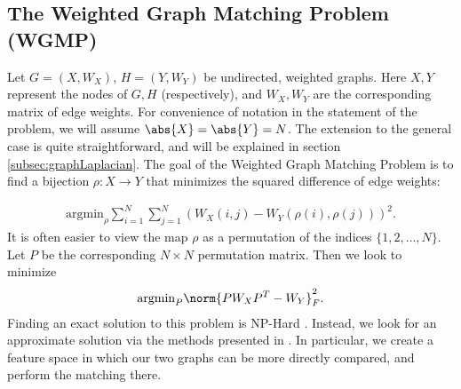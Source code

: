 \documentclass{article}[11pt]
\begin{document}
\subsection{The Weighted Graph Matching Problem (WGMP)}
\label{subsec:WGMP}
Let $G = (X,W_X)$, $H = (Y,W_Y)$ be undirected, weighted graphs. Here $X, Y$
represent the nodes of $G, H$ (respectively), and $W_X,W_Y$ are the corresponding
matrix of edge weights. For convenience of notation in the statement of the
problem, we will assume $\abs{X} = \abs{Y} = N$. The extension to the general
case is quite straightforward, and will be explained in section
\ref{subsec:graphLaplacian}. The goal of the Weighted Graph Matching Problem is
to find a bijection $\rho:X \to Y$ that minimizes the squared difference of edge
weights:

\begin{align}
  \text{argmin}_{\rho}\sum_{i=1}^N\sum_{j=1}^N \left( W_X(i,j) - W_Y(\rho(i),\rho(j)) \right)^2.
\end{align}
It is often easier to view the map $\rho$ as a permutation of the
indices $\{1,2,\ldots,N\}$. Let $P$ be the corresponding $N \times N$
permutation matrix. Then we look to minimize
\begin{align}
  \label{eqn:WGMPperm} \text{argmin}_{P}\norm{PW_XP^T - W_Y}^2_F.
\end{align}
Finding an exact solution to this problem is NP-Hard \cite{Arvind2012}. Instead,
we look for an approximate solution via the methods presented in
\cite{Umeyama1988,Knossow2009}. In particular, we create a feature space in
which our two graphs can be more directly compared, and perform the matching
there.
\end{document}
